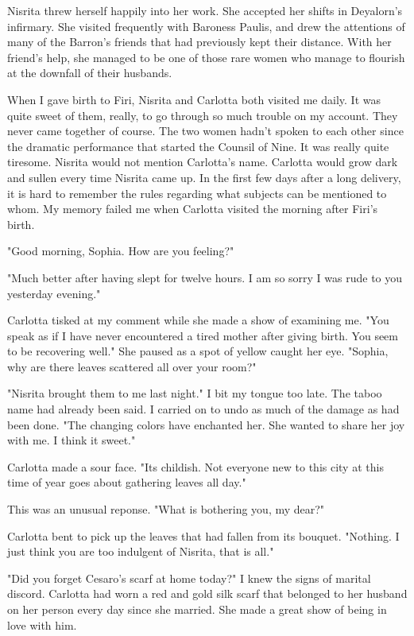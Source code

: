 \documentclass{article}
\begin{document}
Nisrita threw herself happily into her work. She accepted her shifts in Deyalorn's infirmary. She visited frequently with Baroness Paulis, and drew the attentions of many of the Barron's friends that had previously kept their distance. With her friend's help, she managed to be one of those rare women who manage to flourish at the downfall of their husbands.

When I gave birth to Firi, Nisrita and Carlotta both visited me daily. It was quite sweet of them, really, to go through so much trouble on my account. They never came together of course. The two women hadn't spoken to each other since the dramatic performance that started the Counsil of Nine. It was really quite tiresome. Nisrita would not mention Carlotta's name. Carlotta would grow dark and sullen every time Nisrita came up. In the first few days after a long delivery, it is hard to remember the rules regarding what subjects can be mentioned to whom. My memory failed me when Carlotta visited the morning after Firi's birth. 

"Good morning, Sophia. How are you feeling?"

"Much better after having slept for twelve hours. I am so sorry I was rude to you yesterday evening."

Carlotta tisked at my comment while she made a show of examining me. "You speak as if I have never encountered a tired mother after giving birth. You seem to be recovering well." She paused as a spot of yellow caught her eye. "Sophia, why are there leaves scattered all over your room?"

"Nisrita brought them to me last night." I bit my tongue too late. The taboo name had already been said. I carried on to undo as much of the damage as had been done. "The changing colors have enchanted her. She wanted to share her joy with me. I think it sweet."

Carlotta made a sour face. "Its childish. Not everyone new to this city at this time of year goes about gathering leaves all day."

This was an unusual reponse. "What is bothering you, my dear?"

Carlotta bent to pick up the leaves that had fallen from its bouquet. "Nothing. I just think you are too indulgent of Nisrita, that is all."

"Did you forget Cesaro's scarf at home today?" I knew the signs of marital discord. Carlotta had worn a red and gold silk scarf that belonged to her husband on her person every day since she married. She made a great show of being in love with him. 
\end{document}
